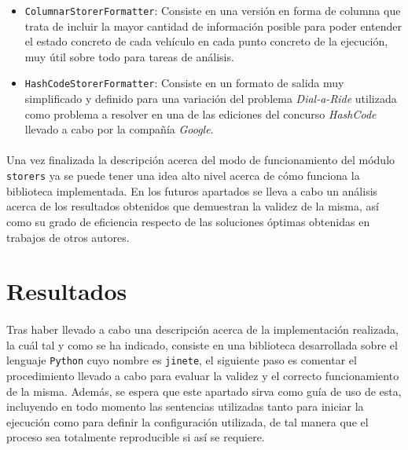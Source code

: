 \documentclass{subfiles}
\begin{document}
          \begin{itemize}
            \item \texttt{ColumnarStorerFormatter}: Consiste en una versión en forma de columna que trata de incluir la mayor cantidad de información posible para poder entender el estado concreto de cada vehículo en cada punto concreto de la ejecución, muy útil sobre todo para tareas de análisis.

            \item \texttt{HashCodeStorerFormatter}: Consiste en un formato de salida muy simplificado y definido para una variación del problema \emph{Dial-a-Ride} utilizada como problema a resolver en una de las ediciones del concurso \emph{HashCode} llevado a cabo por la compañía \emph{Google}.

          \end{itemize}
          \paragraph{}
          Una vez finalizada la descripción acerca del modo de funcionamiento del módulo \texttt{storers} ya se puede tener una idea alto nivel acerca de cómo funciona la biblioteca implementada. En los futuros apartados se lleva a cabo un análisis acerca de los resultados obtenidos que demuestran la validez de la misma, así como su grado de eficiencia respecto de las soluciones óptimas obtenidas en trabajos de otros autores.

    \section{Resultados}
    \label{sec:results}

      \paragraph{}
      Tras haber llevado a cabo una descripción acerca de la implementación realizada, la cuál tal y como se ha indicado, consiste en una biblioteca desarrollada sobre el lenguaje \texttt{Python} cuyo nombre es \texttt{jinete}, el siguiente paso es comentar el procedimiento llevado a cabo para evaluar la validez y el correcto funcionamiento de la misma. Además, se espera que este apartado sirva como guía de uso de esta, incluyendo en todo momento las sentencias utilizadas tanto para iniciar la ejecución como para definir la configuración utilizada, de tal manera que el proceso sea totalmente reproducible si así se requiere.
\end{document}
